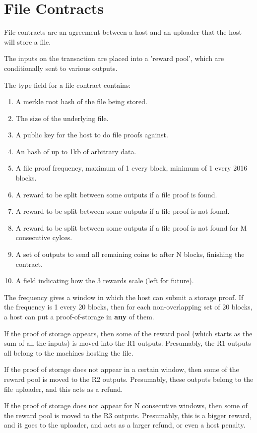 \documentclass[twocolumn]{article}
\begin{document}
\section{File Contracts}
File contracts are an agreement between a host and an uploader that the host will store a file.

The inputs on the transaction are placed into a 'reward pool', which are conditionally sent to various outputs.

The type field for a file contract contains:
\begin{enumerate}
	\item A merkle root hash of the file being stored.
	\item The size of the underlying file.
	\item A public key for the host to do file proofs against.
	\item An hash of up to 1kb of arbitrary data.
	\item A file proof frequency, maximum of 1 every block, minimum of 1 every 2016 blocks.
	\item A reward to be split between some outputs if a file proof is found.
	\item A reward to be split between some outputs if a file proof is not found.
	\item A reward to be split between some outputs if a file proof is not found for M consecutive cylces.
	\item A set of outputs to send all remaining coins to after N blocks, finishing the contract.
	\item A field indicating how the 3 rewards scale (left for future).
\end{enumerate}

The frequency gives a window in which the host can submit a storage proof.
If the frequency is 1 every 20 blocks, then for each non-overlapping set of 20 blocks, a host can put a proof-of-storage in \textbf{any} of them.

If the proof of storage appears, then some of the reward pool (which starts as the sum of all the inputs) is moved into the R1 outputs.
Presumably, the R1 outputs all belong to the machines hosting the file.

If the proof of storage does not appear in a certain window, then some of the reward pool is moved to the R2 outputs.
Presumably, these outputs belong to the file uploader, and this acts as a refund.

If the proof of storage does not appear for N consecutive windows, then some of the reward pool is moved to the R3 outputs.
Presumably, this is a bigger reward, and it goes to the uploader, and acts as a larger refund, or even a host penalty.
\end{document}
